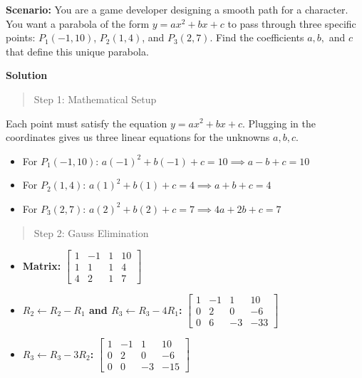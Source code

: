 \documentclass[
  letterpaper,
  DIV=11,
  numbers=noendperiod]{scrreprt}
\providecommand{\tightlist}{%
  \setlength{\itemsep}{0pt}\setlength{\parskip}{0pt}}
\begin{document}
\textbf{Scenario:} You are a game developer designing a smooth path for
a character. You want a parabola of the form \(y = ax^2 + bx + c\) to
pass through three specific points: \(P_1(-1, 10)\), \(P_2(1, 4)\), and
\(P_3(2, 7)\). Find the coefficients \(a, b,\) and \(c\) that define
this unique parabola.

\textbf{Solution}

\begin{quote}
Step 1: Mathematical Setup
\end{quote}

Each point must satisfy the equation \(y = ax^2 + bx + c\). Plugging in
the coordinates gives us three linear equations for the unknowns
\(a, b, c\).

\begin{itemize}
\tightlist
\item
  For \(P_1(-1, 10)\):
  \(a(-1)^2 + b(-1) + c = 10 \implies a - b + c = 10\)
\item
  For \(P_2(1, 4)\): \(a(1)^2 + b(1) + c = 4 \implies a + b + c = 4\)
\item
  For \(P_3(2, 7)\): \(a(2)^2 + b(2) + c = 7 \implies 4a + 2b + c = 7\)
\end{itemize}

\begin{quote}
Step 2: Gauss Elimination
\end{quote}

\begin{itemize}
\tightlist
\item
  \textbf{Matrix:}
  \(\left[ \begin{array}{ccc|c} 1 & -1 & 1 & 10 \\ 1 & 1 & 1 & 4 \\ 4 & 2 & 1 & 7 \end{array} \right]\)
\item
  \textbf{\(R_2 \leftarrow R_2 - R_1\) and
  \(R_3 \leftarrow R_3 - 4R_1\):}
  \(\left[ \begin{array}{ccc|c} 1 & -1 & 1 & 10 \\ 0 & 2 & 0 & -6 \\ 0 & 6 & -3 & -33 \end{array} \right]\)
\item
  \textbf{\(R_3 \leftarrow R_3 - 3R_2\):}
  \(\left[ \begin{array}{ccc|c} 1 & -1 & 1 & 10 \\ 0 & 2 & 0 & -6 \\ 0 & 0 & -3 & -15 \end{array} \right]\)
\end{itemize}
\end{document}

